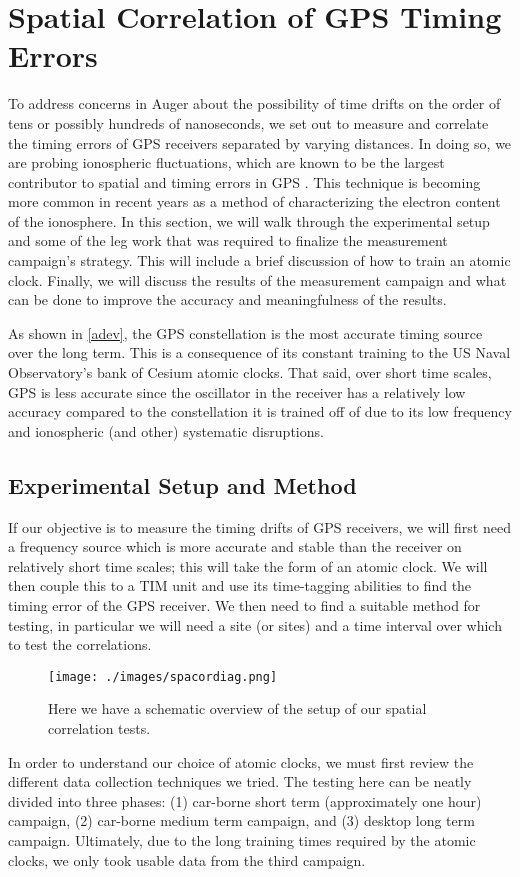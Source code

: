\section{Spatial Correlation of GPS Timing Errors}
\label{spacor}
To address concerns in Auger about the possibility of time drifts on the order of tens or possibly hundreds of nanoseconds, we set out to measure and correlate the timing errors of GPS receivers separated by varying distances. In doing so, we are probing ionospheric fluctuations, which are known to be the largest contributor to spatial and timing errors in GPS \cite{milspec}. This technique is becoming more common in recent years \cite{atmoex,raulgps} as a method of characterizing the electron content of the ionosphere. In this section, we will walk through the experimental setup and some of the leg work that was required to finalize the measurement campaign's strategy. This will include a brief discussion of how to train an atomic clock. Finally, we will discuss the results of the measurement campaign and what can be done to improve the accuracy and meaningfulness of the results.

As shown in \autoref{adev}, the GPS constellation is the most accurate timing source over the long term. This is a consequence of its constant training to the US Naval Observatory's bank of Cesium atomic clocks. That said, over short time scales, GPS is less accurate since the oscillator in the receiver has a relatively low accuracy compared to the constellation it is trained off of due to its low frequency and ionospheric (and other) systematic disruptions.
\subsection{Experimental Setup and Method}
If our objective is to measure the timing drifts of GPS receivers, we will first need a frequency source which is more accurate and stable than the receiver on relatively short time scales; this will take the form of an atomic clock. We will then couple this to a TIM unit and use its time-tagging abilities to find the timing error of the GPS receiver. We then need to find a suitable method for testing, in particular we will need a site (or sites) and a time interval over which to test the correlations. 
\begin{figure}[H]
\centering
\texttt{[image: ./images/spacordiag.png]}
\caption[Spatial Correlations Diagram]{Here we have a schematic overview of the setup of our spatial correlation tests.}
\label{spacordiag}
\end{figure}
In order to understand our choice of atomic clocks, we must first review the different data collection techniques we tried. The testing here can be neatly divided into three phases: (1) car-borne short term (approximately one hour) campaign, (2) car-borne medium term campaign, and (3) desktop long term campaign. Ultimately, due to the long training times required by the atomic clocks, we only took usable data from the third campaign. 

